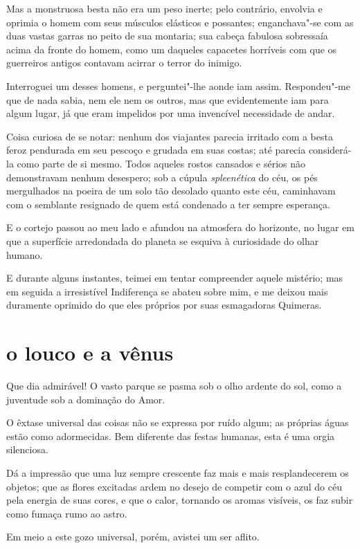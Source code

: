 Mas a monstruosa besta não era um peso inerte; pelo contrário, envolvia
e oprimia o homem com seus músculos elásticos e possantes;
enganchava"-se com as duas vastas garras no peito de sua montaria;
sua cabeça fabulosa sobressaía acima da fronte do homem, como um
daqueles capacetes horríveis com que os guerreiros antigos
contavam acirrar o terror do inimigo.

Interroguei um desses homens, e perguntei"-lhe aonde iam assim.
Respondeu"-me que de nada sabia, nem ele nem os outros, mas que
evidentemente iam para algum lugar, já que eram impelidos por uma invencível
necessidade de andar.

Coisa curiosa de se notar: nenhum dos viajantes parecia irritado com a
besta feroz pendurada em seu pescoço e grudada em suas costas;
até parecia considerá-la como parte de si mesmo. Todos
aqueles rostos cansados e sérios não demonstravam nenhum desespero; sob a
cúpula \textit{spleenética} do céu, os pés mergulhados na poeira de um solo
tão desolado quanto este céu, caminhavam com o semblante
resignado de quem está condenado a ter sempre esperança.

E o cortejo passou ao meu lado e afundou na atmosfera do horizonte, no
lugar em que a superfície arredondada do planeta se esquiva à
curiosidade do olhar humano.

E durante alguns instantes, teimei em tentar compreender aquele mistério;
mas em seguida a irresistível Indiferença se abateu sobre mim, e me
deixou mais duramente oprimido do que eles próprios por suas
esmagadoras Quimeras.

\quebra\section[O louco e a vênus]{o louco e a vênus}

Que dia admirável! O vasto parque se pasma sob o olho ardente do sol,
como a juventude sob a dominação do Amor.

O êxtase universal das coisas não se expressa por ruído algum; as
próprias águas estão como adormecidas. Bem diferente das festas
humanas, esta é uma orgia silenciosa.

Dá a impressão que uma luz sempre crescente faz mais e mais
resplandecerem os objetos; que as flores excitadas ardem no desejo de
competir com o azul do céu pela energia de suas cores, e que o calor,
tornando os aromas visíveis, os faz subir como fumaça rumo ao astro.

Em meio a este gozo universal, porém, avistei um ser aflito.

